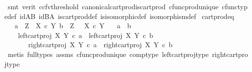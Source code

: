 \begin{isabellebody}
\ {\isacharparenleft}{\kern0pt}smt\ {\isacharparenleft}{\kern0pt}verit{\isacharcomma}{\kern0pt}\ ccfv{\isacharunderscore}{\kern0pt}threshold{\isacharparenright}{\kern0pt}\ canonical{\isacharunderscore}{\kern0pt}cart{\isacharunderscore}{\kern0pt}prod{\isacharunderscore}{\kern0pt}is{\isacharunderscore}{\kern0pt}cart{\isacharunderscore}{\kern0pt}prod\ cfunc{\isacharunderscore}{\kern0pt}prod{\isacharunderscore}{\kern0pt}unique\ cfunc{\isacharunderscore}{\kern0pt}type{\isacharunderscore}{\kern0pt}def\ id{\isacharunderscore}{\kern0pt}AB\ id{\isacharunderscore}{\kern0pt}BA\ is{\isacharunderscore}{\kern0pt}cart{\isacharunderscore}{\kern0pt}prod{\isacharunderscore}{\kern0pt}def\ is{\isacharunderscore}{\kern0pt}isomorphic{\isacharunderscore}{\kern0pt}def\ isomorphism{\isacharunderscore}{\kern0pt}def{\isacharparenright}{\kern0pt}\isanewline
{}\isamarkupfalse%
%
\endisatagproof
{\isafoldproof}%
%
\isadelimproof
\isanewline
%
\endisadelimproof
\isanewline
{}\isamarkupfalse%
\ cart{\isacharunderscore}{\kern0pt}prod{\isacharunderscore}{\kern0pt}eq{\isacharcolon}{\kern0pt}\isanewline
\ \ \ {\isachardoublequoteopen}a\ {\isacharcolon}{\kern0pt}\ Z\ {\isasymrightarrow}\ X\ {\isasymtimes}\isactrlsub c\ Y{\isachardoublequoteclose}\ {\isachardoublequoteopen}b\ {\isacharcolon}{\kern0pt}\ Z\ {\isasymrightarrow}\ \ X\ {\isasymtimes}\isactrlsub c\ Y{\isachardoublequoteclose}\isanewline
\ \ \ {\isachardoublequoteopen}a\ {\isacharequal}{\kern0pt}\ b\ {\isasymlongleftrightarrow}\ \isanewline
\ \ \ \ {\isacharparenleft}{\kern0pt}left{\isacharunderscore}{\kern0pt}cart{\isacharunderscore}{\kern0pt}proj\ X\ Y\ {\isasymcirc}\isactrlsub c\ a\ {\isacharequal}{\kern0pt}\ left{\isacharunderscore}{\kern0pt}cart{\isacharunderscore}{\kern0pt}proj\ X\ Y\ {\isasymcirc}\isactrlsub c\ b\ \isanewline
\ \ \ \ \ \ {\isasymand}\ right{\isacharunderscore}{\kern0pt}cart{\isacharunderscore}{\kern0pt}proj\ X\ Y\ {\isasymcirc}\isactrlsub c\ a\ {\isacharequal}{\kern0pt}\ right{\isacharunderscore}{\kern0pt}cart{\isacharunderscore}{\kern0pt}proj\ X\ Y\ {\isasymcirc}\isactrlsub c\ b{\isacharparenright}{\kern0pt}{\isachardoublequoteclose}\isanewline
%
\isadelimproof
\ \ %
\endisadelimproof
%
\isatagproof
{}\isamarkupfalse%
\ {\isacharparenleft}{\kern0pt}metis\ {\isacharparenleft}{\kern0pt}full{\isacharunderscore}{\kern0pt}types{\isacharparenright}{\kern0pt}\ assms\ cfunc{\isacharunderscore}{\kern0pt}prod{\isacharunderscore}{\kern0pt}unique\ comp{\isacharunderscore}{\kern0pt}type\ left{\isacharunderscore}{\kern0pt}cart{\isacharunderscore}{\kern0pt}proj{\isacharunderscore}{\kern0pt}type\ right{\isacharunderscore}{\kern0pt}cart{\isacharunderscore}{\kern0pt}proj{\isacharunderscore}{\kern0pt}type{\isacharparenright}{\kern0pt}%

\end{isabellebody}
